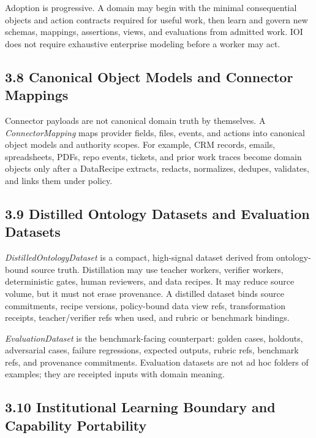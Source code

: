 \documentclass[
  11pt,
]{article}
\begin{document}
Adoption is progressive. A domain may begin with the minimal consequential
objects and action contracts required for useful work, then learn and govern
new schemas, mappings, assertions, views, and evaluations from admitted work.
IOI does not require exhaustive enterprise modeling before a worker may act.

\hypertarget{canonical-object-models-and-connector-mappings}{%
\subsection{3.8 Canonical Object Models and Connector
Mappings}\label{canonical-object-models-and-connector-mappings}}

Connector payloads are not canonical domain truth by themselves. A
\emph{ConnectorMapping} maps provider fields, files, events, and actions
into canonical object models and authority scopes. For example, CRM
records, emails, spreadsheets, PDFs, repo events, tickets, and prior
work traces become domain objects only after a DataRecipe extracts,
redacts, normalizes, dedupes, validates, and links them under policy.

\hypertarget{distilled-ontology-datasets-and-evaluation-datasets}{%
\subsection{3.9 Distilled Ontology Datasets and Evaluation
Datasets}\label{distilled-ontology-datasets-and-evaluation-datasets}}

\emph{DistilledOntologyDataset} is a compact, high-signal dataset
derived from ontology-bound source truth. Distillation may use teacher
workers, verifier workers, deterministic gates, human reviewers, and
data recipes. It may reduce source volume, but it must not erase
provenance. A distilled dataset binds source commitments, recipe
versions, policy-bound data view refs, transformation receipts,
teacher/verifier refs when used, and rubric or benchmark bindings.

\emph{EvaluationDataset} is the benchmark-facing counterpart: golden
cases, holdouts, adversarial cases, failure regressions, expected
outputs, rubric refs, benchmark refs, and provenance commitments.
Evaluation datasets are not ad hoc folders of examples; they are
receipted inputs with domain meaning.

\hypertarget{institutional-learning-boundary}{%
\subsection{3.10 Institutional Learning Boundary and Capability
Portability}\label{institutional-learning-boundary}}
\end{document}
